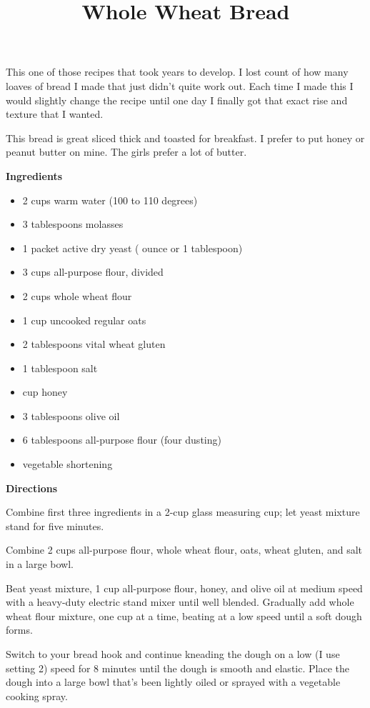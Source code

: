 \documentclass{article}
\title{Whole Wheat Bread}
\begin{document}
This one of those recipes that took years to develop. I lost count of how many
loaves of bread I made that just didn't quite work out. Each time I made this I
would slightly change the recipe until one day I finally got that exact rise
and texture that I wanted.

This bread is great sliced thick and toasted for breakfast. I prefer to put honey
or peanut butter on mine. The girls prefer a lot of butter.

\bigskip

\bigskip

\textbf{Ingredients}
\begin{multicols}{2}
    \begin{itemize}
        \item 2 cups warm water (100 to 110 degrees)
        \item 3 tablespoons molasses
        \item 1 packet active dry yeast ( ounce or 1 tablespoon)
        \item 3 cups all-purpose flour, divided
        \item 2 cups whole wheat flour
        \item 1 cup uncooked regular oats
        \item 2 tablespoons vital wheat gluten
        \item 1 tablespoon salt
        \item {} cup honey
        \item 3 tablespoons olive oil
        \item 6 tablespoons all-purpose flour (four dusting)
        \item vegetable shortening
    \end{itemize}
\end{multicols}

\textbf{Directions}

Combine first three ingredients in a 2-cup glass measuring cup; let yeast
mixture stand for five minutes.

Combine 2 cups all-purpose flour, whole wheat flour, oats, wheat gluten, and salt in a large bowl.

Beat yeast mixture, 1 cup all-purpose flour, honey, and olive oil at medium speed with
a heavy-duty electric stand mixer until well blended. Gradually add whole wheat flour
mixture, one cup at a time, beating at a low speed until a soft dough forms.

Switch to your bread hook and continue kneading the dough on a low (I use setting 2)
speed for 8 minutes until the dough is smooth and elastic. Place the dough into a
large bowl that's been lightly oiled or sprayed with a vegetable cooking spray.
\end{document}
